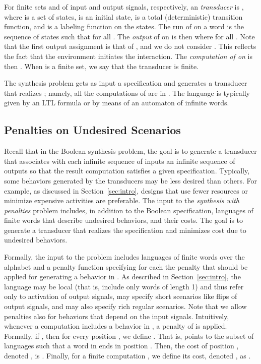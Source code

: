 \documentclass[runningheads,a4paper]{llncs}
\begin{document}
For finite sets  and  of input and output signals, respectively, an {\em   transducer} is , where  is a set of states,  is an initial state,  is a total (deterministic) transition function, and  is a labeling function on the states. The run of  on a word  is the sequence of states  such that  for all . The {\em output} of  on  is then  where  for all . Note that the first output assignment is that of , and we do not consider . This reflects the fact that the environment initiates the interaction. The {\em computation of  on \/} is then 
.
When  is a finite set, we say that the transducer is  finite.

The synthesis problem gets as input a specification  and generates a transducer  that realizes ; namely, all the computations of  are in . The language  is typically given by an LTL formula \cite{Pnu81} or by means of an automaton of infinite words. 


\vspace*{-8pt}
\subsection{Penalties on Undesired Scenarios}
Recall that in the Boolean synthesis problem, the goal is to generate a transducer that associates with each infinite sequence of inputs an infinite sequence of outputs so that the result computation satisfies a given specification. Typically, some behaviors generated by the transducers may be less desired than others. For example, as discussed in Section~\ref{sec:intro}, designs that use fewer resources or minimize expensive activities are preferable. The input to the {\em synthesis with penalties\/} problem includes, in addition to the Boolean specification, languages of finite words that describe undesired behaviors, and their costs. 
The goal is to generate a transducer that realizes the specification and minimizes cost due to undesired behaviors. 

Formally, the input to the problem includes languages  of finite words over the alphabet  and a penalty function  specifying for each  the penalty that should be applied for generating a behavior in . As described in Section~\ref{sec:intro}, the language  may be local (that is, include only words of length 1) and thus refer only to activation of output signals, may specify short scenarios like flips of output signals, and may also specify rich regular scenarios. Note that we allow penalties also for behaviors that depend on the input signals. Intuitively, whenever a computation  includes a behavior in , a penalty of  is applied. Formally, if , then for every position , we define . That is,  points to the subset of languages  such that a word in  ends in position . Then, the cost of position , denoted , is . 
Finally, for a finite computation , we define its cost, denoted , as .
\end{document}
